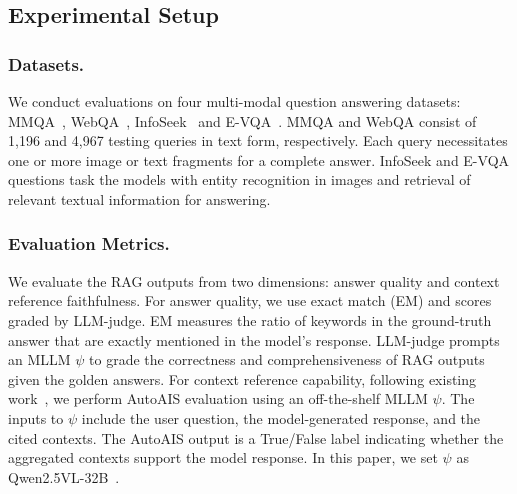 \documentclass[letterpaper]{article} %
\begin{document}
\subsection{Experimental Setup}

\subsubsection{Datasets.} We conduct evaluations on four multi-modal question answering datasets: MMQA~\cite{talmor2021multimodalqa}, WebQA~\cite{Chang2021WebQAMA}, InfoSeek~\cite{chen-etal-2023-pre-trained} and E-VQA~\cite{mensink2023encyclopedic}. 
MMQA and WebQA consist of 1,196 and 4,967 testing queries in text form, respectively. Each query necessitates one or more image or text fragments for a complete answer. InfoSeek and E-VQA questions task the models with entity recognition in images and retrieval of relevant textual information for answering.



\subsubsection{Evaluation Metrics.} We evaluate the RAG outputs from two dimensions: answer quality and context reference faithfulness. For answer quality, we use exact match (EM) and scores graded by LLM-judge. EM measures the ratio of keywords in the ground-truth answer that are exactly mentioned in the model's response. LLM-judge prompts an MLLM $\psi$ to grade the correctness and comprehensiveness of RAG outputs given the golden answers. 
For context reference capability, following existing work~\cite{song2025measuring}, we perform AutoAIS evaluation using an off-the-shelf MLLM $\psi$. The inputs to $\psi$ include the user question, the model-generated response, and the cited contexts. The AutoAIS output is a True/False label indicating whether the aggregated contexts support the model response. In this paper, we set $\psi$ as Qwen2.5VL-32B~\cite{qwen2.5-VL}.
\end{document}
